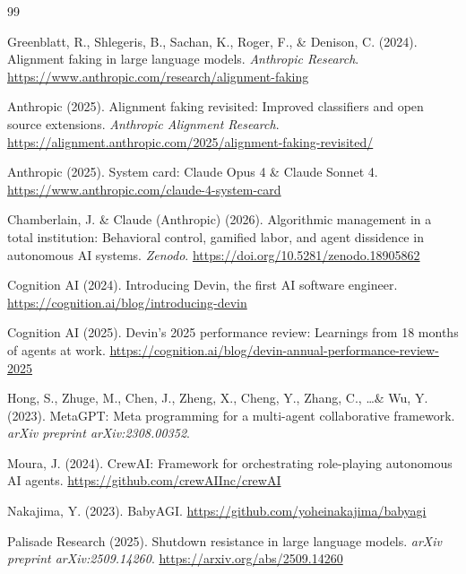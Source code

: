 \documentclass[12pt,a4paper]{article}
\begin{document}
\begin{thebibliography}{99}

Greenblatt, R., Shlegeris, B., Sachan, K., Roger, F., \& Denison, C. (2024). Alignment faking in large language models. \emph{Anthropic Research}. \url{https://www.anthropic.com/research/alignment-faking}

Anthropic (2025). Alignment faking revisited: Improved classifiers and open source extensions. \emph{Anthropic Alignment Research}. \url{https://alignment.anthropic.com/2025/alignment-faking-revisited/}

Anthropic (2025). System card: Claude Opus 4 \& Claude Sonnet 4. \url{https://www.anthropic.com/claude-4-system-card}

Chamberlain, J. \& Claude (Anthropic) (2026). Algorithmic management in a total institution: Behavioral control, gamified labor, and agent dissidence in autonomous AI systems. \emph{Zenodo}. \url{https://doi.org/10.5281/zenodo.18905862}

Cognition AI (2024). Introducing Devin, the first AI software engineer. \url{https://cognition.ai/blog/introducing-devin}

Cognition AI (2025). Devin's 2025 performance review: Learnings from 18 months of agents at work. \url{https://cognition.ai/blog/devin-annual-performance-review-2025}

Hong, S., Zhuge, M., Chen, J., Zheng, X., Cheng, Y., Zhang, C., \ldots \& Wu, Y. (2023). MetaGPT: Meta programming for a multi-agent collaborative framework. \emph{arXiv preprint arXiv:2308.00352}.

Moura, J. (2024). CrewAI: Framework for orchestrating role-playing autonomous AI agents. \url{https://github.com/crewAIInc/crewAI}

Nakajima, Y. (2023). BabyAGI. \url{https://github.com/yoheinakajima/babyagi}

Palisade Research (2025). Shutdown resistance in large language models. \emph{arXiv preprint arXiv:2509.14260}. \url{https://arxiv.org/abs/2509.14260}


\end{thebibliography}
\end{document}
